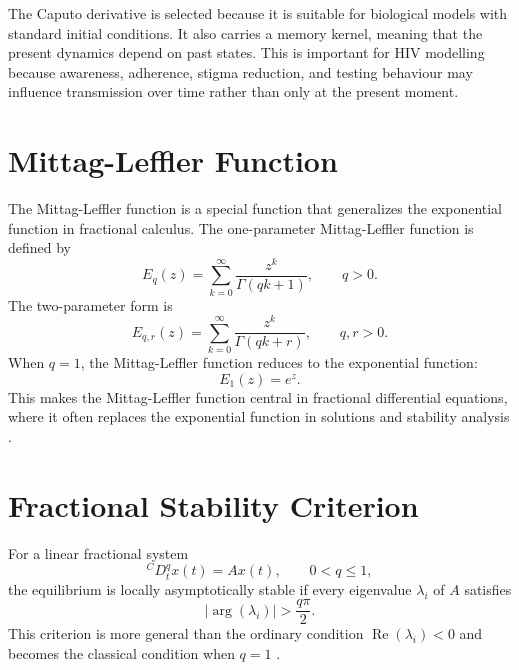 \documentclass[12pt,a4paper,oneside]{report}
\newcommand{\CaputoD}[2]{{}^{C}D_{#1}^{#2}}
\begin{document}
\begin{remarkbox}[title={Why the Caputo Derivative is Selected}]
The Caputo derivative is selected because it is suitable for biological models with standard initial conditions. It also carries a memory kernel, meaning that the present dynamics depend on past states. This is important for HIV modelling because awareness, adherence, stigma reduction, and testing behaviour may influence transmission over time rather than only at the present moment.
\end{remarkbox}

\section{Mittag-Leffler Function}
The Mittag-Leffler function is a special function that generalizes the exponential function in fractional calculus. The one-parameter Mittag-Leffler function is defined by
\begin{equation}
E_q(z)=\sum_{k=0}^{\infty}\frac{z^k}{\Gamma(qk+1)}, \qquad q>0.
\end{equation}
The two-parameter form is
\begin{equation}
E_{q,r}(z)=\sum_{k=0}^{\infty}\frac{z^k}{\Gamma(qk+r)}, \qquad q,r>0.
\end{equation}
When $q=1$, the Mittag-Leffler function reduces to the exponential function:
\begin{equation}
E_1(z)=e^z.
\end{equation}
This makes the Mittag-Leffler function central in fractional differential equations, where it often replaces the exponential function in solutions and stability analysis \citep{Kilbas2006,Diethelm2010}.

\section{Fractional Stability Criterion}
For a linear fractional system
\begin{equation}
\CaputoD{t}{q}x(t)=Ax(t), \qquad 0<q\leq1,
\end{equation}
the equilibrium is locally asymptotically stable if every eigenvalue $\lambda_i$ of $A$ satisfies
\begin{equation}
|\arg(\lambda_i)|>\frac{q\pi}{2}.
\label{eq:fractional_stability}
\end{equation}
This criterion is more general than the ordinary condition $\operatorname{Re}(\lambda_i)<0$ and becomes the classical condition when $q=1$ \citep{Matignon1996}.
\end{document}
